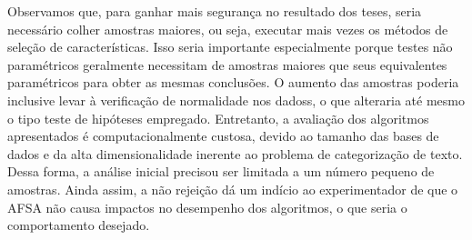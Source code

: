 \documentclass[conference]{IEEEtran}
\begin{document}
Observamos que, para ganhar mais segurança no resultado dos teses, seria necessário colher amostras maiores, ou seja, executar mais vezes os métodos de seleção de características. Isso seria importante especialmente porque testes não paramétricos geralmente necessitam de amostras maiores que seus equivalentes paramétricos para obter as mesmas conclusões.
O aumento das amostras poderia inclusive levar à verificação de normalidade nos dadoss, o que alteraria até mesmo o tipo teste de hipóteses empregado. Entretanto, a avaliação dos algoritmos apresentados é computacionalmente custosa, devido ao tamanho das bases de dados e da alta dimensionalidade inerente ao problema de categorização de texto. Dessa forma, a análise inicial precisou ser limitada a um número pequeno de amostras.
Ainda assim, a não rejeição dá um indício ao experimentador de que o AFSA não causa impactos no desempenho dos algoritmos, o que seria o comportamento desejado.





% 

\end{document}
